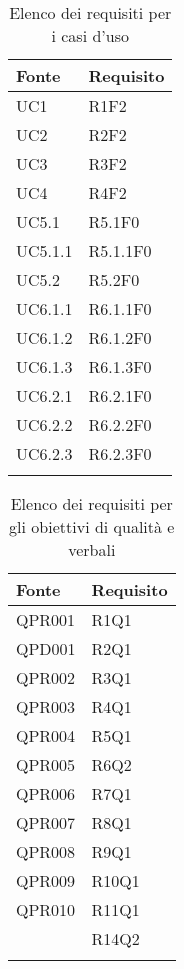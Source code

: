 		\begin{table}[H]
			\centering
			{\def\arraystretch{1.5}
			\begin{tabularx}{\textwidth}{YY}
				\textbf{Fonte} & \textbf{Requisito} \\
				\toprule
				UC1 & R1F2 \\
				UC2 & R2F2 \\
				UC3 & R3F2 \\
				UC4 & R4F2 \\
				UC5.1 & R5.1F0 \\
				UC5.1.1 & R5.1.1F0 \\
				UC5.2 & R5.2F0 \\
				UC6.1.1 & R6.1.1F0 \\
				UC6.1.2 & R6.1.2F0 \\
				UC6.1.3 & R6.1.3F0 \\
				UC6.2.1 & R6.2.1F0 \\
				UC6.2.2 & R6.2.2F0 \\
				UC6.2.3 & R6.2.3F0 \\
				\bottomrule \\
			\end{tabularx}}
			\caption{Elenco dei requisiti per i casi d'uso}
		\end{table}

		\begin{table}[H]
		\centering
		{\def\arraystretch{1.5}
		\begin{tabularx}{\textwidth}{YY}
			\textbf{Fonte} & \textbf{Requisito} \\
			\toprule
			QPR001 & R1Q1 \\
			QPD001 & R2Q1 \\
			QPR002 & R3Q1 \\
			QPR003 & R4Q1 \\
			QPR004 & R5Q1 \\
			QPR005 & R6Q2 \\
			QPR006 & R7Q1 \\
			QPR007 & R8Q1 \\
			QPR008 & R9Q1 \\
			QPR009 & R10Q1 \\
			QPR010 & R11Q1 \\
			 & R14Q2 \\
			\bottomrule\\
		\end{tabularx}}
		\caption{Elenco dei requisiti per gli obiettivi di qualità e verbali}
	\end{table}

